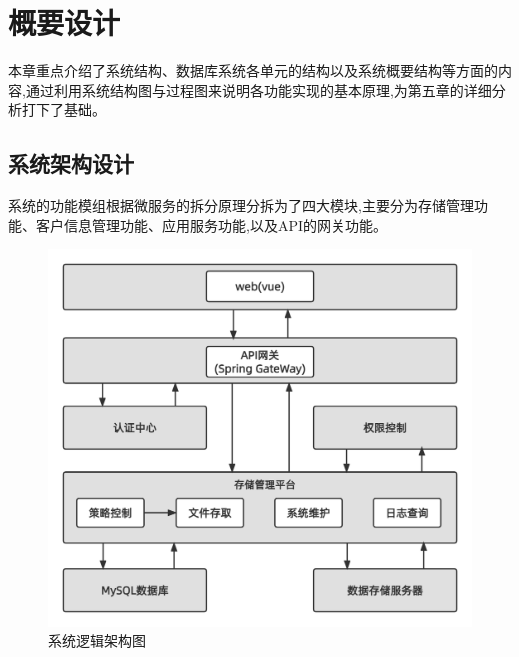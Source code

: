 \chapter{概要设计}


本章重点介绍了系统结构、数据库系统各单元的结构以及系统概要结构等方面的内容,通过利用系统结构图与过程图来说明各功能实现的基本原理,为第五章的详细分析打下了基础。
\section{系统架构设计}

系统的功能模组根据微服务的拆分原理分拆为了四大模块,主要分为存储管理功能、客户信息管理功能、应用服务功能,以及API的网关功能。
\begin{figure}[h]
    \centering
    \includegraphics[width=1\textwidth]{my_figures/chapter4/系统逻辑架构.png}
    \caption{系统逻辑架构图}
    \label{fig:系统逻辑架构图}
\end{figure}


